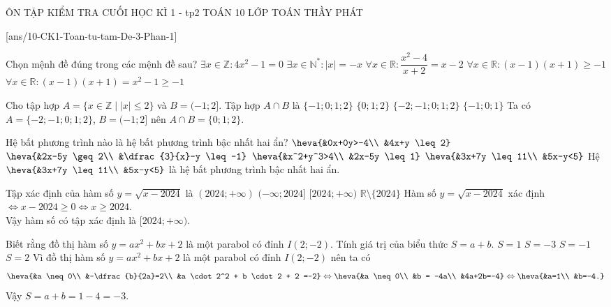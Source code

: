 \begin{name}
	{ÔN TẬP KIỂM TRA CUỐI HỌC KÌ 1 - tp2}
	{TOÁN 10}
	{LỚP TOÁN THẦY PHÁT}
	{\thoigian}
\end{name}

\caulc
{}[ans/10-CK1-Toan-tu-tam-De-3-Phan-1]

\begin{ex}%
Chọn mệnh đề đúng trong các mệnh đề sau?
\choice
{$\exists x\in \mathbb{Z}:4x^2-1=0$}
{$\exists x\in {{\mathbb{N}}^{*}}:\left| x \right|=-x$}  { $\forall x\in \mathbb{R}:\dfrac{x^2-4}{x+2}=x-2$}
{\True $\forall x\in \mathbb{R}:(x-1 )(x+1 )\ge -1$}
\loigiai
{$\forall x\in \mathbb{R}:(x-1 )(x+1 )=x^2-1\ge -1$}
\end{ex}

\begin{ex}%
Cho tập hợp $A=\{x \in \mathbb{Z} \mid |x| \leq 2\}$ và $B=(-1 ; 2]$. Tập hợp $A \cap B$ là
	\choice
	{$\{-1 ; 0 ; 1 ; 2\}$}
	{\True $\{0 ; 1 ; 2\}$}
	{$\{-2 ;-1 ; 0 ; 1 ; 2\}$}
	{$\{-1 ; 0 ; 1\}$}
	\loigiai
	{
	Ta có $A=\{-2 ;-1 ; 0 ; 1 ; 2\}$, $B=(-1 ; 2]$ nên $A \cap B=\{0 ; 1 ; 2\}$.
	}
\end{ex}
\begin{ex}%
Hệ bất phương trình nào là hệ bất phương trình bậc nhất hai ẩn?
	\choice
	{$\heva{&0x+0y>-4\\ &4x+y \leq 2}$}
	{$\heva{&2x-5y \geq 2\\ &\dfrac{3}{x}-y \leq-1}$}
	{$\heva{&x^2+y^3>4\\ &2x-5y \leq 1}$}
	{\True $\heva{&3x+7y \leq 11\\ &5x-y<5}$}
	\loigiai
	{
	Hệ $\heva{&3x+7y \leq 11\\ &5x-y<5}$ là hệ bất phương trình bậc nhất hai ẩn.
	}
\end{ex}
\begin{ex}%
Tập xác định của hàm số $y=\sqrt{x-2024}$ là
	\choice
	{$(2024 ;+\infty)$}
	{$(-\infty ; 2024]$}
	{\True $[2024 ;+\infty)$}
	{$\mathbb{R} \setminus\{2024\}$}
	\loigiai
	{
	Hàm số $y=\sqrt{x-2024}$ xác định $\Leftrightarrow x-2024 \geq 0 \Leftrightarrow x \geq 2024$.\\
	Vậy hàm số có tập xác định là $[2024 ;+\infty)$.
	}
\end{ex}
\begin{ex}%
Biết rằng đồ thị hàm số $y=ax^2+bx+2$ là một parabol có đỉnh $I(2 ;-2)$. Tính giá trị của biểu thức $S=a+b$.
	\choice
	{$S=1$}
	{\True $S=-3$}
	{$S=-1$}
	{$S=2$}
	\loigiai
	{
	Vì đồ thị hàm số $y=a x^{2}+b x+2$ là một parabol có đỉnh $I(2 ;-2)$ nên ta có
	$$\heva{&a \neq 0\\ &-\dfrac{b}{2a}=2\\ &a \cdot 2^2 + b \cdot 2 + 2 =-2} \Leftrightarrow \heva{&a \neq 0\\ &b = -4a\\ &4a+2b=-4} \Leftrightarrow \heva{&a=1\\ &b=-4.}$$
	Vậy $S=a+b=1-4=-3$.
	}
\end{ex}
